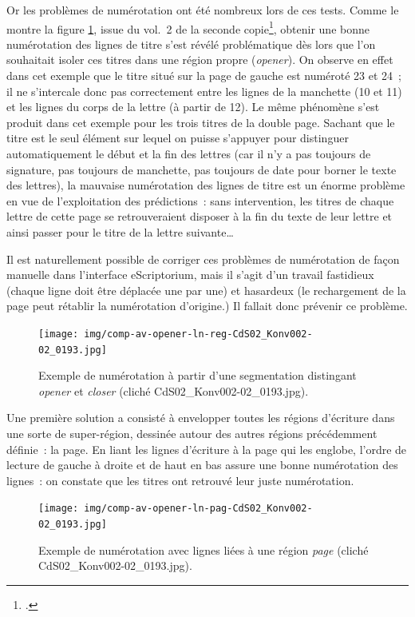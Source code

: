 \documentclass[a4paper,12pt,twoside]{book}
\begin{document}
				Or les problèmes de numérotation ont été nombreux lors de ces tests. Comme le montre la figure \ref{comp-av-opener-ln-reg-193}, issue du vol.~2 de la seconde copie\footcite{CdS02001369}, obtenir une bonne numérotation des lignes de titre s'est révélé problématique dès lors que l'on souhaitait isoler ces titres dans une région propre (\textit{opener}). On observe en effet dans cet exemple que le titre situé sur la page de gauche est numéroté 23 et 24~; il ne s'intercale donc pas correctement entre les lignes de la manchette (10 et 11) et les lignes du corps de la lettre (à partir de 12). Le même phénomène s'est produit dans cet exemple pour les trois titres de la double page. Sachant que le titre est le seul élément sur lequel on puisse s'appuyer pour distinguer automatiquement le début et la fin des lettres (car il n'y a pas toujours de signature, pas toujours de manchette, pas toujours de date pour borner le texte des lettres), la mauvaise numérotation des lignes de titre est un énorme problème en vue de l'exploitation des \glspl{prédiction}~: sans intervention, les titres de chaque lettre de cette page se retrouveraient disposer à la fin du texte de leur lettre et ainsi passer pour le titre de la lettre suivante…
				
				Il est naturellement possible de corriger ces problèmes de numérotation de façon manuelle dans l'interface eScriptorium, mais il s'agit d'un travail fastidieux (chaque ligne doit être déplacée une par une) et hasardeux (le rechargement de la page peut rétablir la  numérotation d'origine.) Il fallait donc prévenir ce problème.
				
				\begin{figure}[!h]
					\centering
					\texttt{[image: img/comp-av-opener-ln-reg-CdS02\_Konv002-02\_0193.jpg]}
					\caption{Exemple de numérotation à partir d'une segmentation distingant \textit{opener} et \textit{closer} (cliché CdS02\_Konv002-02\_0193.jpg).}
					\label{comp-av-opener-ln-reg-193}
				\end{figure}
			
				Une première solution a consisté à envelopper toutes les régions d'écriture dans une sorte de super-région, dessinée autour des autres régions précédemment définie~: la page. En liant les lignes d'écriture à la page qui les englobe, l'ordre de lecture de gauche à droite et de haut en bas assure une bonne numérotation des lignes~: on constate que les titres ont retrouvé leur juste numérotation.
				
				\begin{figure}[!h]
					\centering
					\texttt{[image: img/comp-av-opener-ln-pag-CdS02\_Konv002-02\_0193.jpg]}
					\caption{Exemple de numérotation avec lignes liées à une région \textit{page} (cliché CdS02\_Konv002-02\_0193.jpg).}
					\label{annotation-page-66}
				\end{figure}
				
\end{document}
